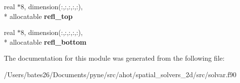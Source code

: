 \begin{DoxyCompactItemize}
\item 
\hypertarget{classsolvar_af29eb10335c7759fed480c446ebfc589}{real $\ast$8, dimension(\+:,\+:,\+:,\+:,\+:), \\*
allocatable {\bfseries refl\+\_\+top}}\label{classsolvar_af29eb10335c7759fed480c446ebfc589}

\item 
\hypertarget{classsolvar_a5ce62c4bd849dd94ecdcea30ff3de1be}{real $\ast$8, dimension(\+:,\+:,\+:,\+:,\+:), \\*
allocatable {\bfseries refl\+\_\+bottom}}\label{classsolvar_a5ce62c4bd849dd94ecdcea30ff3de1be}

\end{DoxyCompactItemize}


The documentation for this module was generated from the following file\+:\begin{DoxyCompactItemize}
\item 
/\+Users/bates26/\+Documents/pyne/src/ahot/spatial\+\_\+solvers\+\_\+2d/src/solvar.\+f90\end{DoxyCompactItemize}
